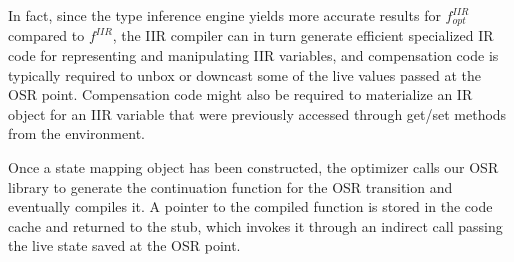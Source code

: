\noindent In fact, since the type inference engine yields more accurate results for $f^{IIR}_{opt}$ compared to $f^{IIR}$, the IIR compiler can in turn generate efficient specialized IR code for representing and manipulating IIR variables, and compensation code is typically required to unbox or downcast some of the live values passed at the OSR point. Compensation code might also be required to materialize an IR object for an IIR variable that were previously accessed through get/set methods from the environment.

Once a state mapping object has been constructed, the optimizer calls our OSR library to generate the continuation function for the OSR transition and eventually compiles it. A pointer to the compiled function is stored in the code cache and returned to the stub, which invokes it through an indirect call passing the live state saved at the OSR point.